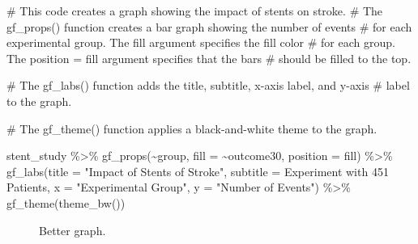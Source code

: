 \documentclass[
  letterpaper,
  DIV=11,
  numbers=noendperiod]{scrreprt}
\newenvironment{Shaded}{\begin{snugshade}}{\end{snugshade}}
\newcommand{\AttributeTok}[1]{\textcolor[rgb]{0.40,0.45,0.13}{#1}}
\newcommand{\CommentTok}[1]{\textcolor[rgb]{0.37,0.37,0.37}{#1}}
\newcommand{\FunctionTok}[1]{\textcolor[rgb]{0.28,0.35,0.67}{#1}}
\newcommand{\NormalTok}[1]{\textcolor[rgb]{0.00,0.23,0.31}{#1}}
\newcommand{\SpecialCharTok}[1]{\textcolor[rgb]{0.37,0.37,0.37}{#1}}
\newcommand{\StringTok}[1]{\textcolor[rgb]{0.13,0.47,0.30}{#1}}
\begin{document}
\begin{Shaded}
\begin{Highlighting}[]
\CommentTok{\# This code creates a graph showing the impact of stents on stroke.}
\CommentTok{\# The \textasciigrave{}gf\_props()\textasciigrave{} function creates a bar graph showing the number of events}
\CommentTok{\# for each experimental group. The \textasciigrave{}fill\textasciigrave{} argument specifies the fill color}
\CommentTok{\# for each group. The \textasciigrave{}position = \textquotesingle{}fill\textquotesingle{}\textasciigrave{} argument specifies that the bars}
\CommentTok{\# should be filled to the top.}

\CommentTok{\# The \textasciigrave{}gf\_labs()\textasciigrave{} function adds the title, subtitle, x{-}axis label, and y{-}axis}
\CommentTok{\# label to the graph.}

\CommentTok{\# The \textasciigrave{}gf\_theme()\textasciigrave{} function applies a black{-}and{-}white theme to the graph.}

\NormalTok{stent\_study }\SpecialCharTok{\%\textgreater{}\%}
\FunctionTok{gf\_props}\NormalTok{(}\SpecialCharTok{\textasciitilde{}}\NormalTok{group, }\AttributeTok{fill =} \SpecialCharTok{\textasciitilde{}}\NormalTok{outcome30, }\AttributeTok{position =} \StringTok{\textquotesingle{}fill\textquotesingle{}}\NormalTok{) }\SpecialCharTok{\%\textgreater{}\%}
  \FunctionTok{gf\_labs}\NormalTok{(}\AttributeTok{title =} \StringTok{"Impact of Stents of Stroke"}\NormalTok{,}
          \AttributeTok{subtitle =} \StringTok{\textquotesingle{}Experiment with 451 Patients\textquotesingle{}}\NormalTok{,}
          \AttributeTok{x =} \StringTok{"Experimental Group"}\NormalTok{,}
          \AttributeTok{y =} \StringTok{"Number of Events"}\NormalTok{) }\SpecialCharTok{\%\textgreater{}\%}
  \FunctionTok{gf\_theme}\NormalTok{(}\FunctionTok{theme\_bw}\NormalTok{())}
\end{Highlighting}
\end{Shaded}

\begin{figure}[H]


\caption{\label{fig-cs1}Better graph.}

\end{figure}%
\end{document}
